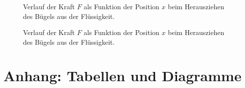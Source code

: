 \documentclass[11pt,a4paper]{article}
\begin{document}
\begin{figure}[p]
\centering
{}
\caption{Verlauf der Kraft $F$ als Funktion der Position $x$ beim Herausziehen des B\"ugels aus der Fl\"ussigkeit.}
\label{abbildung}
\end{figure}

\begin{figure}[p]
\centering
{}
\caption{Verlauf der Kraft $F$ als Funktion der Position $x$ beim Herausziehen des B\"ugels aus der Fl\"ussigkeit.}
\label{abbildung}
\end{figure}


\section{Anhang: Tabellen und Diagramme}
\end{document}
